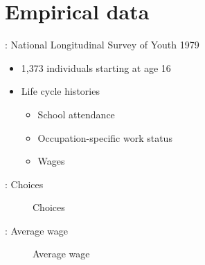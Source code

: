 \section{Empirical data}
\begin{frame}{\insertsection: National Longitudinal Survey of Youth 1979}

\begin{itemize}
	\item 1,373 individuals starting at age 16
	\item Life cycle histories
	\begin{itemize}
		\item School attendance
		\item Occupation-specific work status
		\item Wages
	\end{itemize}
\end{itemize}
\end{frame}
\begin{frame}{\insertsection: Choices}
  \begin{figure}
  \caption{Choices}
  \end{figure}
\end{frame}

\begin{frame}{\insertsection: Average wage}
  \begin{figure}
  \caption{Average wage}
  \end{figure}
\end{frame}
